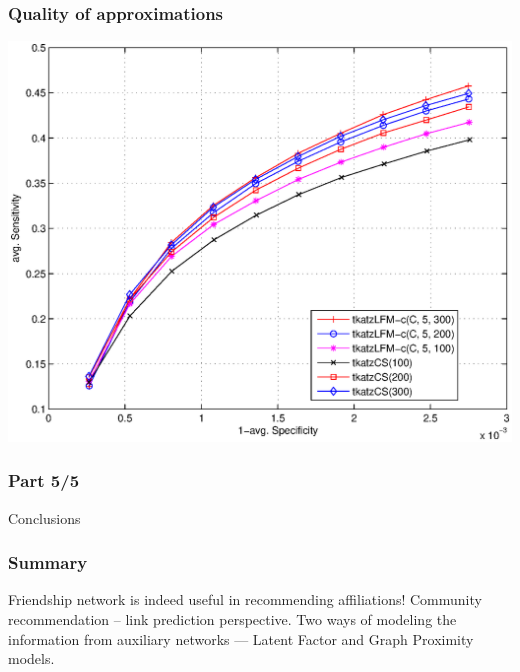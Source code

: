 \documentclass[handout]{beamer}
\begin{document}

\begin{frame}
\frametitle{Quality of approximations}
\begin{center}
\includegraphics[scale=0.4]{../journalPaper/summaryRankDependencyYoutube.eps}
\end{center}
\end{frame}

\begin{frame}
\frametitle{Part 5/5}
  \hspace{1.1in}
  \centerline{\huge{Conclusions}}
\end{frame}

\begin{frame}
\frametitle{Summary}
\begin{itemize}
\pitem Friendship network is indeed useful in recommending affiliations!
\pitem Community recommendation -- link prediction perspective.
\pitem Two ways of modeling the information from auxiliary networks --- Latent Factor and Graph Proximity models.
\end{itemize}
\end{frame}
\end{document}
